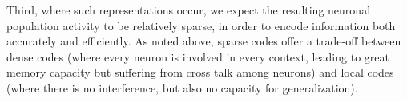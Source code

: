 Third, where such representations occur, we expect the resulting
neuronal population activity to be relatively sparse,
in order to encode information both accurately and efficiently.
As noted above, sparse codes offer a trade-off between 
dense codes (where every neuron is involved in every context,
leading to great memory capacity but suffering from cross talk among neurons)
and local codes (where there is no interference, 
but also no capacity for generalization).


\section*{}






